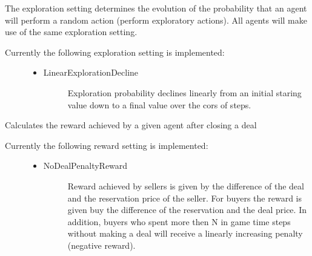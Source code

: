 \documentclass[letterpaper,10pt,english]{sphinxmanual}
\begin{document}
\sphinxAtStartPar
The exploration setting determines the evolution of the probability that an agent will perform a random action (perform
exploratory actions). All agents will make use of the same exploration setting.
\begin{description}
\item[{Currently the following exploration setting is implemented:}] \leavevmode\begin{itemize}
\item {} \begin{description}
\item[{LinearExplorationDecline}] \leavevmode
\sphinxAtStartPar
Exploration probability declines linearly from an initial staring value down to a final
value over the cors of  steps.

\end{description}

\end{itemize}

\end{description}

\sphinxAtStartPar
{}

\sphinxAtStartPar
Calculates the reward achieved by a given agent after closing a deal
\begin{description}
\item[{Currently the following reward setting is implemented:}] \leavevmode\begin{itemize}
\item {} \begin{description}
\item[{NoDealPenaltyReward}] \leavevmode
\sphinxAtStartPar
Reward achieved by sellers is given by the difference of the deal and the reservation
price of the seller. For buyers the reward is given buy the difference of the reservation
and the deal price. In addition, buyers who spent more then N in game time steps without
making a deal will receive a linearly increasing penalty (negative reward).

\end{description}

\end{itemize}

\end{description}
\end{document}
